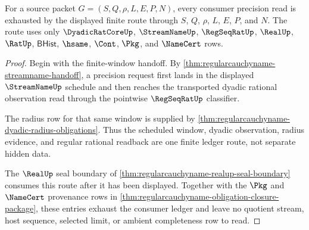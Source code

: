 \begin{theorem}
\label{thm:regularcauchyname-window-ledger-exhaustion}
For a source packet $G=(S,Q,\rho,L,E,P,N)$, every consumer precision read is exhausted by the displayed finite route through $S$, $Q$, $\rho$, $L$, $E$, $P$, and $N$. The route uses only $\DyadicRatCoreUp$, $\StreamNameUp$, $\RegSeqRatUp$, $\RealUp$, $\RatUp$, $\mathsf{BHist}$, $\hsame$, $\Cont$, $\Pkg$, and $\NameCert$ rows.
\end{theorem}
\begin{proof}
Begin with the finite-window handoff. By \autoref{thm:regularcauchyname-streamname-handoff}, a precision request first lands in the displayed $\StreamNameUp$ schedule and then reaches the transported dyadic rational observation read through the pointwise $\RegSeqRatUp$ classifier.

The radius row for that same window is supplied by \autoref{thm:regularcauchyname-dyadic-radius-obligations}. Thus the scheduled window, dyadic observation, radius evidence, and regular rational readback are one finite ledger route, not separate hidden data.

The $\RealUp$ seal boundary of \autoref{thm:regularcauchyname-realup-seal-boundary} consumes this route after it has been displayed. Together with the $\Pkg$ and $\NameCert$ provenance rows in \autoref{thm:regularcauchyname-obligation-closure-package}, these entries exhaust the consumer ledger and leave no quotient stream, host sequence, selected limit, or ambient completeness row to read.
\end{proof}

